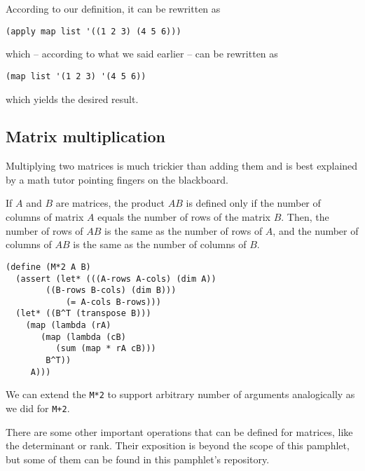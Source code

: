 According to our definition, it can be rewritten as

\begin{Verbatim}[samepage=true]
(apply map list '((1 2 3) (4 5 6)))
\end{Verbatim}

which -- according to what we said earlier -- can
be rewritten as

\begin{Verbatim}[samepage=true]
(map list '(1 2 3) '(4 5 6))
\end{Verbatim}

which yields the desired result.

\subsection{Matrix multiplication}

Multiplying two matrices is much trickier than adding
them and is best explained by a math tutor pointing
fingers on the blackboard.

If $A$ and $B$ are matrices, the product $AB$ is
defined only if the number of columns of matrix $A$
equals the number of rows of the matrix $B$. Then,
the number of rows of $AB$ is the same as the number
of rows of $A$, and the number of columns of $AB$
is the same as the number of columns of $B$.

\begin{Verbatim}[samepage=true]
(define (M*2 A B)
  (assert (let* (((A-rows A-cols) (dim A))
		((B-rows B-cols) (dim B)))
            (= A-cols B-rows)))
  (let* ((B^T (transpose B)))
    (map (lambda (rA)
	   (map (lambda (cB)
		  (sum (map * rA cB)))
		B^T))
	 A)))
\end{Verbatim}

We can extend the \texttt{M*2} to support arbitrary
number of arguments analogically as we did for \texttt{M+2}.

There are some other important operations that can be defined
for matrices, like the determinant or rank. Their exposition
is beyond the scope of this pamphlet, but some of them can
be found in this pamphlet's repository.

